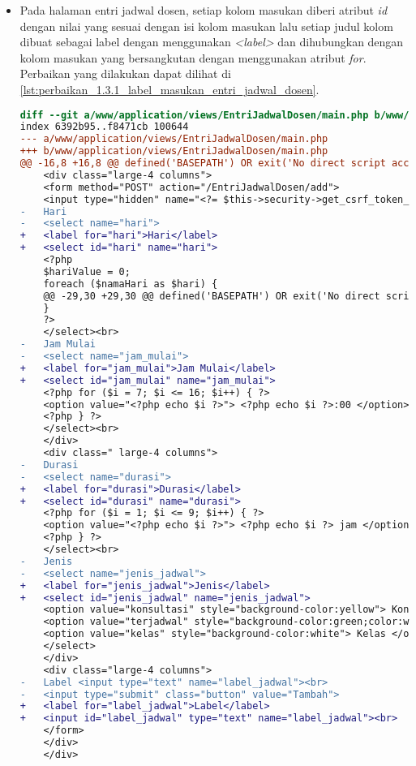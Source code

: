 \begin{itemize}
\item Pada halaman entri jadwal dosen, setiap kolom masukan diberi atribut \textit{id} dengan nilai yang sesuai dengan isi kolom masukan lalu setiap judul kolom dibuat sebagai label dengan menggunakan \textit{<label>} dan dihubungkan dengan kolom masukan yang bersangkutan dengan menggunakan atribut \textit{for}. Perbaikan yang dilakukan dapat dilihat di \ref{lst:perbaikan_1.3.1_label_masukan_entri_jadwal_dosen}.
\begin{lstlisting}[frame=single, label={lst:perbaikan_1.3.1_label_masukan_entri_jadwal_dosen}, language=diff, caption=Perbaikan Kriteria Sukses 1.3.1 - Tidak Terdapat Label pada Kolom Masukan di Halaman Entri Jadwal Dosen]
diff --git a/www/application/views/EntriJadwalDosen/main.php b/www/application/views/EntriJadwalDosen/main.php
index 6392b95..f8471cb 100644
--- a/www/application/views/EntriJadwalDosen/main.php
+++ b/www/application/views/EntriJadwalDosen/main.php
@@ -16,8 +16,8 @@ defined('BASEPATH') OR exit('No direct script access allowed');
    <div class="large-4 columns">
    <form method="POST" action="/EntriJadwalDosen/add">
    <input type="hidden" name="<?= $this->security->get_csrf_token_name() ?>" value="<?= $this->security->get_csrf_hash() ?>" />
-   Hari
-   <select name="hari"> 
+   <label for="hari">Hari</label>
+   <select id="hari" name="hari">
    <?php
    $hariValue = 0;
    foreach ($namaHari as $hari) {
    @@ -29,30 +29,30 @@ defined('BASEPATH') OR exit('No direct script access allowed');
    }
    ?>
    </select><br>
-   Jam Mulai
-   <select name="jam_mulai"> 
+   <label for="jam_mulai">Jam Mulai</label>
+   <select id="jam_mulai" name="jam_mulai"> 
    <?php for ($i = 7; $i <= 16; $i++) { ?>
    <option value="<?php echo $i ?>"> <?php echo $i ?>:00 </option>
    <?php } ?>
    </select><br>
    </div>
    <div class=" large-4 columns">
-   Durasi
-   <select name="durasi"> 
+   <label for="durasi">Durasi</label>
+   <select id="durasi" name="durasi"> 
    <?php for ($i = 1; $i <= 9; $i++) { ?>
    <option value="<?php echo $i ?>"> <?php echo $i ?> jam </option>
    <?php } ?>
    </select><br>
-   Jenis  
-   <select name="jenis_jadwal"> 
+   <label for="jenis_jadwal">Jenis</label>
+   <select id="jenis_jadwal" name="jenis_jadwal"> 
    <option value="konsultasi" style="background-color:yellow"> Konsultasi </option>
    <option value="terjadwal" style="background-color:green;color:white"> Terjadwal</option>
    <option value="kelas" style="background-color:white"> Kelas </option>
    </select>
    </div>
    <div class="large-4 columns">
-   Label <input type="text" name="label_jadwal"><br>
-   <input type="submit" class="button" value="Tambah">
+   <label for="label_jadwal">Label</label>
+   <input id="label_jadwal" type="text" name="label_jadwal"><br>
    </form>
    </div>
    </div>
\end{lstlisting}
\end{itemize}

